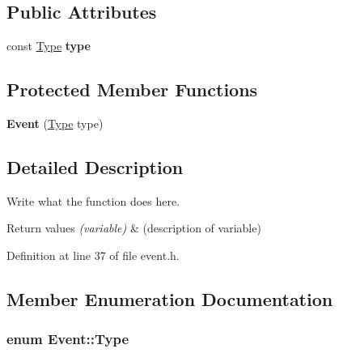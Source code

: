 \subsection*{Public Attributes}
\begin{DoxyCompactItemize}
\item 
\hypertarget{classEvent_a86404000a5e0b6b3afdb2c88d4923e3b}{const \hyperlink{classEvent_a2abf13b5be49315e9e362af02029f058}{Type} {\bfseries type}}\label{classEvent_a86404000a5e0b6b3afdb2c88d4923e3b}

\end{DoxyCompactItemize}
\subsection*{Protected Member Functions}
\begin{DoxyCompactItemize}
\item 
\hypertarget{classEvent_a07dd964621d0623bfccc24197c2f509b}{{\bfseries Event} (\hyperlink{classEvent_a2abf13b5be49315e9e362af02029f058}{Type} type)}\label{classEvent_a07dd964621d0623bfccc24197c2f509b}

\end{DoxyCompactItemize}


\subsection{Detailed Description}
Write what the function does here. 


\begin{DoxyRetVals}{Return values}
{\em (variable)} & (description of variable) \\
\hline
\end{DoxyRetVals}


Definition at line 37 of file event.\+h.



\subsection{Member Enumeration Documentation}
\hypertarget{classEvent_a2abf13b5be49315e9e362af02029f058}{
\subsubsection[{Type}]{\setlength{\rightskip}{0pt plus 5cm}enum {\bf Event\+::\+Type}}}\label{classEvent_a2abf13b5be49315e9e362af02029f058}


